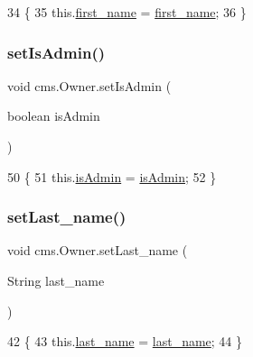 \begin{DoxyCode}
34                                                  \{
35         this.\mbox{\hyperlink{classcms_1_1_owner_a1cae339c355e6861c6d257004a654b1c}{first\_name}} = \mbox{\hyperlink{classcms_1_1_owner_a1cae339c355e6861c6d257004a654b1c}{first\_name}};
36     \}
\end{DoxyCode}
\mbox{\label{classcms_1_1_owner_a382b3d498d22ac601131a224724f61a8}} 
\subsubsection{\texorpdfstring{set\+Is\+Admin()}{setIsAdmin()}}
{\footnotesize\ttfamily void cms.\+Owner.\+set\+Is\+Admin (\begin{DoxyParamCaption}\item[{boolean}]{is\+Admin }\end{DoxyParamCaption})\hspace{0.3cm}{\ttfamily [inline]}}


\begin{DoxyCode}
50                                             \{
51         this.\mbox{\hyperlink{classcms_1_1_owner_a0437c5a1a3071521a64846b09c0c6f7e}{isAdmin}} = \mbox{\hyperlink{classcms_1_1_owner_a0437c5a1a3071521a64846b09c0c6f7e}{isAdmin}};
52     \}
\end{DoxyCode}
\mbox{\label{classcms_1_1_owner_a792b7b26d6e10486874eea66a8d01f87}} 
\subsubsection{\texorpdfstring{set\+Last\+\_\+name()}{setLast\_name()}}
{\footnotesize\ttfamily void cms.\+Owner.\+set\+Last\+\_\+name (\begin{DoxyParamCaption}\item[{String}]{last\+\_\+name }\end{DoxyParamCaption})\hspace{0.3cm}{\ttfamily [inline]}}


\begin{DoxyCode}
42                                                \{
43         this.\mbox{\hyperlink{classcms_1_1_owner_a0e60226c1b9f367b9fcff9e41adece5e}{last\_name}} = \mbox{\hyperlink{classcms_1_1_owner_a0e60226c1b9f367b9fcff9e41adece5e}{last\_name}};
44     \}
\end{DoxyCode}
\mbox{\label{classcms_1_1_owner_a422cd6b9649baddab39c732a072f5f71}} 
